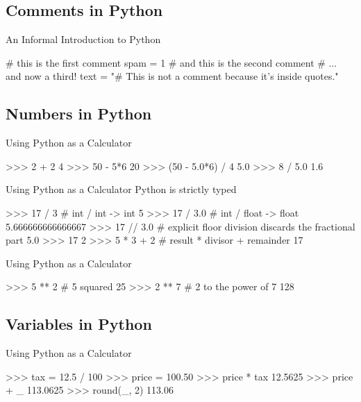 \documentclass[11pt]{beamer}
\begin{document}
\subsection{Comments in Python}
\begin{frame}[containsverbatim]{An Informal Introduction to Python}
\begin{python}
# this is the first comment
spam = 1  # and this is the second comment
          # ... and now a third!
text = "# This is not a comment because it's inside quotes."
\end{python}
\end{frame}

\subsection{Numbers in Python}
\begin{frame}[containsverbatim]{Using Python as a Calculator}
\begin{python}
>>> 2 + 2
4
>>> 50 - 5*6
20
>>> (50 - 5.0*6) / 4
5.0
>>> 8 / 5.0
1.6
\end{python}
\end{frame}


\begin{frame}[containsverbatim]{Using Python as a Calculator}
Python is strictly typed
\begin{python}
>>> 17 / 3  # int / int -> int
5
>>> 17 / 3.0  # int / float -> float
5.666666666666667
>>> 17 // 3.0  # explicit floor division discards the fractional part
5.0
>>> 17 %
2
>>> 5 * 3 + 2  # result * divisor + remainder
17
\end{python}
\end{frame}


\begin{frame}[containsverbatim]{Using Python as a Calculator}
\begin{python}
>>> 5 ** 2  # 5 squared
25
>>> 2 ** 7  # 2 to the power of 7
128
\end{python}
\end{frame}

\subsection{Variables in Python} 
\begin{frame}[containsverbatim]{Using Python as a Calculator}
\begin{python}
>>> tax = 12.5 / 100
>>> price = 100.50
>>> price * tax
12.5625
>>> price + _
113.0625
>>> round(_, 2)
113.06
\end{python}
\end{frame}
\end{document}
